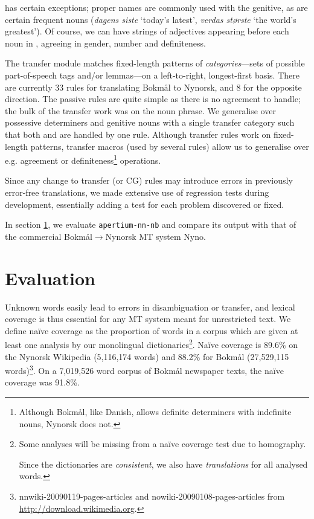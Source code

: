 \documentclass[11pt]{article}
\begin{document}
\Last has certain exceptions; proper names are commonly used with the
genitive, as are certain frequent nouns (\emph{dagens siste} `today's
latest', \emph{verdas største} `the world's greatest'). Of course, we
can have strings of adjectives appearing before each noun in
\Last[a-d], agreeing in gender, number and definiteness. 

The transfer module matches fixed-length patterns of
\emph{categories}—sets of possible part-of-speech tags and/or
lemmas—on a left-to-right, longest-first basis. There are currently 33
rules for translating Bokmål to Nynorsk, and 8 for the opposite
direction. The passive rules are quite simple as there is no agreement
to handle; the bulk of the transfer work was on the noun phrase. We
generalise over possessive determiners and genitive nouns with a
single transfer category such that both \Last[a-b] and \Last[c-d] are
handled by one rule. Although transfer rules work on fixed-length
patterns, transfer macros (used by several rules) allow us to
generalise over e.g. agreement or definiteness\footnote{Although
  Bokmål, like Danish, allows definite determiners with indefinite
  nouns, Nynorsk does not.} operations.

Since any change to transfer (or CG) rules may introduce
errors in previously error-free translations, we made extensive use of
regression tests during development, essentially adding a test for
each problem discovered or fixed.

In section \ref{sec:eval}, we evaluate {\tt \small  apertium-nn-nb} and
compare its output with that of the commercial
Bokmål$\rightarrow$Nynorsk MT system Nyno.


\section{Evaluation}
\label{sec:eval}

Unknown words easily lead to errors in disambiguation or
transfer, and lexical coverage is thus essential for any MT system meant for
unrestricted text.  We define naïve coverage as the proportion of
words in a corpus which are given at least one analysis by our
monolingual dictionaries\footnote{Some analyses will be missing from a
naïve coverage test due to homography. 

Since the dictionaries are \emph{consistent}, we also have
\emph{translations} for all analysed words.}. Naïve coverage is 89.6\%
on the Nynorsk Wikipedia (5,116,174 words) and 88.2\% for Bokmål
(27,529,115 words)\footnote{nnwiki-20090119-pages-articles and nowiki-20090108-pages-articles from \href{http://download.wikimedia.org}{http://download.wikimedia.org}.}. On a 7,019,526 word corpus of Bokmål newspaper
texts, the naïve coverage was 91.8\%.
\end{document}
